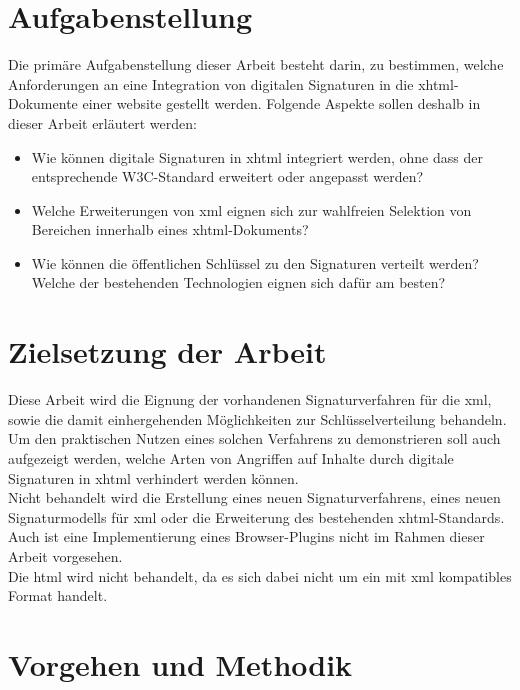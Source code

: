 \section{Aufgabenstellung}
%
\label{sec:Einleitung:aufgabenstellung}
Die primäre Aufgabenstellung dieser Arbeit besteht darin, zu bestimmen, welche Anforderungen an eine Integration von digitalen Signaturen in die
\gls{xhtml}-Dokumente einer \gls{website} gestellt werden. Folgende Aspekte sollen deshalb in dieser Arbeit erläutert werden:
\begin{itemize}
    \item Wie können digitale Signaturen in \gls{xhtml} integriert werden, ohne dass der entsprechende W3C-Standard\cite{xhtml:w3c} erweitert oder angepasst
    werden?
    \item Welche Erweiterungen von \gls{xml} eignen sich zur wahlfreien Selektion von Bereichen innerhalb eines \gls{xhtml}-Dokuments?
    \item Wie können die öffentlichen Schlüssel zu den Signaturen verteilt werden? Welche der bestehenden Technologien eignen sich dafür am besten?
\end{itemize}

\section{Zielsetzung der Arbeit}
\label{sec:Einleitung:ziele}
Diese Arbeit wird die Eignung der vorhandenen Signaturverfahren für die \gls{xml}, sowie die damit einhergehenden Möglichkeiten zur Schlüsselverteilung
behandeln. Um den praktischen Nutzen eines solchen Verfahrens zu demonstrieren soll auch aufgezeigt werden, welche Arten von Angriffen auf Inhalte durch
digitale Signaturen in \gls{xhtml} verhindert werden können.\\

Nicht behandelt wird die Erstellung eines neuen Signaturverfahrens, eines neuen Signaturmodells für \gls{xml} oder die Erweiterung des bestehenden
\gls{xhtml}-Standards. Auch ist eine Implementierung eines Browser-Plugins nicht im Rahmen dieser Arbeit vorgesehen.\\
Die \gls{html} wird nicht behandelt, da es sich dabei nicht um ein mit \gls{xml} kompatibles Format handelt.

\section{Vorgehen und Methodik}
\label{sec:Einleitung:methodik}


